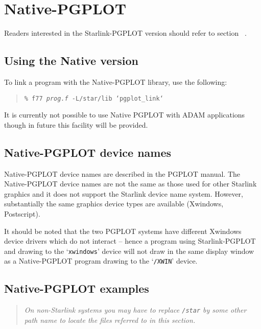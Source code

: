 \documentclass[twoside,11pt,nolof]{starlink}
\begin{document}
\section{Native-PGPLOT}
\label{native-pgplot}

Readers interested in the Starlink-PGPLOT version should refer to
section~\latexhtml{\ref{starlink-pgplot}} %
{}.

\subsection{Using the Native version}
\label{using_the_native_version}

To link a program with the Native-PGPLOT library, use the following:

\begin{quote}
\texttt{\% f77 \emph{prog.f} -L/star/lib `pgplot\_link`}
\end{quote}

It is currently not possible to use Native PGPLOT with ADAM applications
though in future this facility will be provided.

\subsection{Native-PGPLOT device names}
\label{native-pgplot_device_names}

Native-PGPLOT device names are described in the PGPLOT manual.  The
Native-PGPLOT device names are not the same as those used for other
Starlink graphics and it does not support the Starlink device name system.
However, substantially the same graphics device types are available
(Xwindows, Postscript).

It should be noted that the two PGPLOT systems have different Xwindows
device drivers which do not interact -- hence a program using
Starlink-PGPLOT and drawing to the `\texttt{xwindows}' device will not draw
in the same display window as a Native-PGPLOT program drawing to the
`\texttt{/XWIN}' device.

\subsection{Native-PGPLOT examples}
\label{native_pgplot_examples}

\begin{quote}
\emph{ On non-Starlink systems you may have to replace \texttt{/star} by
some other path name to locate the files referred to in this section.}
\end{quote}
\end{document}
